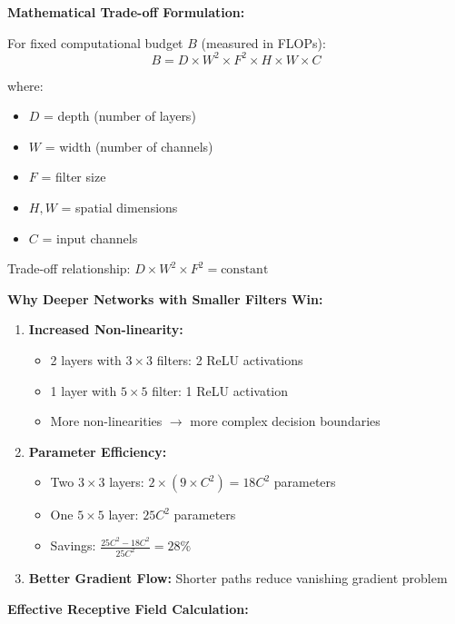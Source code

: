\documentclass[12pt]{article}
\newcommand{\explanation}[1]{{\color{explanationcolor}#1}}
\begin{document}
\begin{enumerate}[(a)]
    \explanation{
    \textbf{Mathematical Trade-off Formulation:}
    
    For fixed computational budget $B$ (measured in FLOPs):
    $$B = D \times W^2 \times F^2 \times H \times W \times C$$
    
    where:
    \begin{itemize}
        \item $D$ = depth (number of layers)
        \item $W$ = width (number of channels)
        \item $F$ = filter size
        \item $H, W$ = spatial dimensions
        \item $C$ = input channels
    \end{itemize}
    
    Trade-off relationship: $D \times W^2 \times F^2 = \text{constant}$
    
    \textbf{Why Deeper Networks with Smaller Filters Win:}
    
    \begin{enumerate}
        \item \textbf{Increased Non-linearity:} 
        \begin{itemize}
            \item 2 layers with $3 \times 3$ filters: 2 ReLU activations
            \item 1 layer with $5 \times 5$ filter: 1 ReLU activation
            \item More non-linearities $\rightarrow$ more complex decision boundaries
        \end{itemize}
        
        \item \textbf{Parameter Efficiency:}
        \begin{itemize}
            \item Two $3 \times 3$ layers: $2 \times (9 \times C^2) = 18C^2$ parameters
            \item One $5 \times 5$ layer: $25C^2$ parameters
            \item Savings: $\frac{25C^2 - 18C^2}{25C^2} = 28\%$
        \end{itemize}
        
        \item \textbf{Better Gradient Flow:} Shorter paths reduce vanishing gradient problem
    \end{enumerate}
    
    \textbf{Effective Receptive Field Calculation:}
    
}
\end{enumerate}
\end{document}
